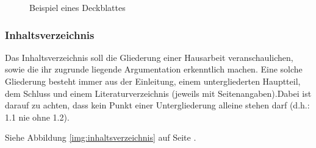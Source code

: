 \documentclass[ 12pt,
                titlepage,
                parskip=half,
                version=first,
                bibliography=totocnumbered,
                final,
                listof=totoc]{scrartcl}
\begin{document}
\begin{figure}[ht]
\centering
{}
\caption{Beispiel eines Deckblattes}
\label{img:deckblatt}
\end{figure}

\subsubsection{Inhaltsverzeichnis}

Das Inhaltsverzeichnis soll die Gliederung einer Hausarbeit veranschaulichen,
sowie die ihr zugrunde liegende Argumentation erkenntlich machen. Eine solche
Gliederung besteht immer aus der Einleitung, einem untergliederten Hauptteil,
dem Schluss und einem Literaturverzeichnis (jeweils mit Seitenangaben).Dabei ist
darauf zu achten, dass kein Punkt einer Untergliederung alleine stehen darf
(d.h.: 1.1 nie ohne 1.2).

Siehe Abbildung \ref{img:inhaltsverzeichnis} auf Seite
\pageref{img:inhaltsverzeichnis}.
\end{document}

